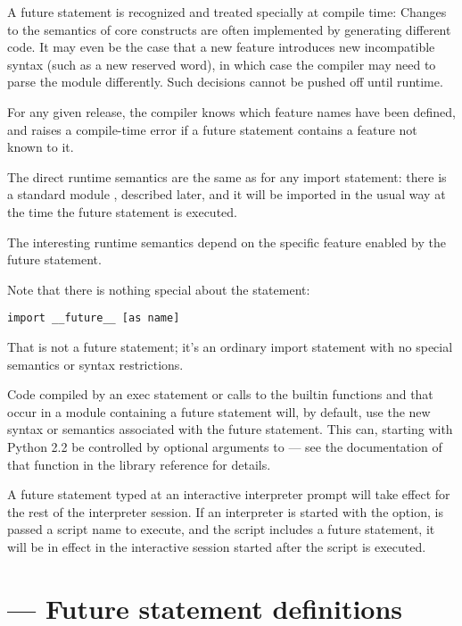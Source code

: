 A future statement is recognized and treated specially at compile
time: Changes to the semantics of core constructs are often
implemented by generating different code.  It may even be the case
that a new feature introduces new incompatible syntax (such as a new
reserved word), in which case the compiler may need to parse the
module differently.  Such decisions cannot be pushed off until
runtime.

For any given release, the compiler knows which feature names have been
defined, and raises a compile-time error if a future statement contains
a feature not known to it.

The direct runtime semantics are the same as for any import statement:
there is a standard module , described later, and
it will be imported in the usual way at the time the future statement
is executed.

The interesting runtime semantics depend on the specific feature
enabled by the future statement.

Note that there is nothing special about the statement:

\begin{verbatim}
import __future__ [as name]
\end{verbatim}

That is not a future statement; it's an ordinary import statement with
no special semantics or syntax restrictions.

Code compiled by an exec statement or calls to the builtin functions
 and  that occur in a module
 containing a future statement will, by default, use the new 
syntax or semantics associated with the future statement.  This can,
starting with Python 2.2 be controlled by optional arguments to
 --- see the documentation of that function in the 
library reference for details.

A future statement typed at an interactive interpreter prompt will
take effect for the rest of the interpreter session.  If an
interpreter is started with the  option, is passed a
script name to execute, and the script includes a future statement, it
will be in effect in the interactive session started after the script
is executed.

\section{ ---
	 Future statement definitions}

